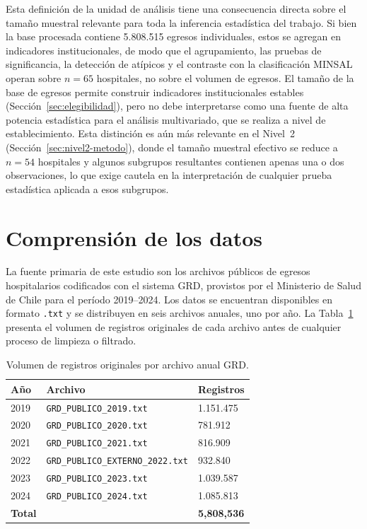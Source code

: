 Esta definición de la unidad de análisis tiene una consecuencia directa sobre el
tamaño muestral relevante para toda la inferencia estadística del trabajo. Si
bien la base procesada contiene 5.808.515 egresos individuales, estos se
agregan en indicadores institucionales, de modo que el agrupamiento, las pruebas
de significancia, la detección de atípicos y el contraste con la clasificación
MINSAL operan sobre $n = 65$ hospitales, no sobre el volumen de egresos. El
tamaño de la base de egresos permite construir indicadores institucionales
estables (Sección~\ref{sec:elegibilidad}), pero no debe interpretarse como una
fuente de alta potencia estadística para el análisis multivariado, que se
realiza a nivel de establecimiento. Esta distinción es aún más relevante en el
Nivel~2 (Sección~\ref{sec:nivel2-metodo}), donde el tamaño muestral efectivo se
reduce a $n = 54$ hospitales y algunos subgrupos resultantes contienen apenas
una o dos observaciones, lo que exige cautela en la interpretación de cualquier
prueba estadística aplicada a esos subgrupos.

\section{Comprensión de los datos}
\label{sec:datos}

La fuente primaria de este estudio son los archivos públicos de egresos
hospitalarios codificados con el sistema GRD, provistos por el Ministerio de
Salud de Chile para el período 2019--2024. Los datos se encuentran disponibles
en formato \texttt{.txt} y se distribuyen en seis archivos anuales, uno por año.
La Tabla~\ref{tab:volumen-registros} presenta el volumen de registros originales
de cada archivo antes de cualquier proceso de limpieza o filtrado.

\begin{table}[htbp]
\centering
\caption{Volumen de registros originales por archivo anual GRD.}
\label{tab:volumen-registros}
\begin{tabular}{lll}
\toprule
\textbf{Año} & \textbf{Archivo} & \textbf{Registros} \\
\midrule
2019 & \texttt{GRD\_PUBLICO\_2019.txt} & 1.151.475 \\
2020 & \texttt{GRD\_PUBLICO\_2020.txt} &   781.912 \\
2021 & \texttt{GRD\_PUBLICO\_2021.txt} &   816.909 \\
2022 & \texttt{GRD\_PUBLICO\_EXTERNO\_2022.txt} &   932.840 \\
2023 & \texttt{GRD\_PUBLICO\_2023.txt} & 1.039.587 \\
2024 & \texttt{GRD\_PUBLICO\_2024.txt} & 1.085.813 \\
\midrule
\textbf{Total} & & \textbf{5{,}808{,}536} \\
\bottomrule
\end{tabular}
\end{table}

